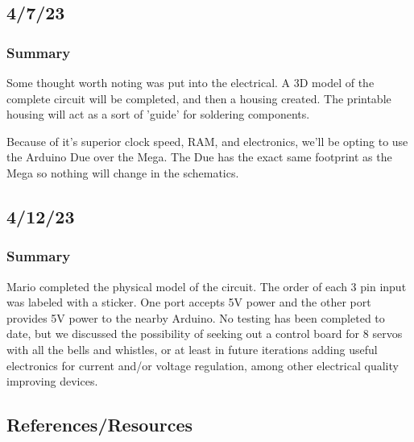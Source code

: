 \documentclass[a4paper, 10pt]{article}
\begin{document}
	\subsection{4/7/23}
		\subsubsection{Summary}
		Some thought worth noting was put into the electrical. A 3D model of the complete circuit will be completed, and then a housing created. The printable housing will act as a sort of 'guide' for soldering components. 
		
		Because of it's superior clock speed, RAM, and electronics, we'll be opting to use the Arduino Due over the Mega. The Due has the exact same footprint as the Mega so nothing will change in the schematics.
		
	\subsection{4/12/23}
		\subsubsection{Summary}
		Mario completed the physical model of the circuit. The order of each 3 pin input was labeled with a sticker. One port accepts 5V power and the other port provides 5V power to the nearby Arduino. No testing has been completed to date, but we discussed the possibility of seeking out a control board for 8 servos with all the bells and whistles, or at least in future iterations adding useful electronics for current and/or voltage regulation, among other electrical quality improving devices.
		
	\subsection{References/Resources}
\end{document}
